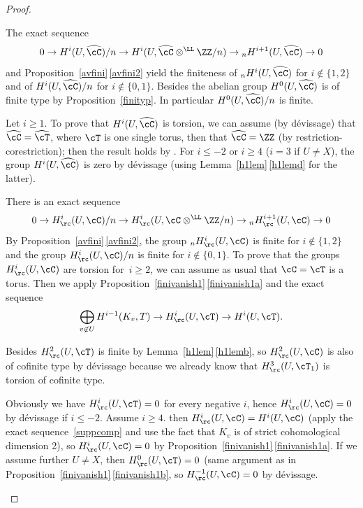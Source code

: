 \skpt
\begin{proof}
\begin{enumeratea}
\item
The exact sequence
\begin{equation} \label{kummer3}
0 \to H^i(U,\widehat \cC)/n \to H^i(U,\widehat \cC
\otimes^\LL \ZZ/n) \to{}_n H^{i+1}(U,\widehat \cC) \to 0
\end{equation}
and Proposition~\ref{avfini}\,\eqref{avfini2} yield the finiteness of
$_n H^i(U,\widehat \cC)$ for $i \not \in \{1, 2\}$
and of $H^i(U,\widehat \cC)/n$ for $i \not \in \{0, 1\}$.
Besides the abelian group $H^0(U,\widehat \cC)$ is of finite type
by Proposition~\ref{finityp}.
In particular $H^0(U,\widehat \cC)/n$ is finite.

Let $i \geq 1$. To prove that $H^i(U,\widehat \cC)$ is torsion,
we can assume (by dévissage) that $\widehat \cC=\widehat \cT$, where
$\cT$ is one single torus,
then that $\widehat \cC=\ZZ$ (by restriction-corestriction); then
the result holds by \cite[Lem.\,II.2.10]{MilADT}. For $i \leq -2$ or
$i \geq 4$ (\resp $i=3$ if $U \neq X$),
the group $H^i(U,\widehat \cC)$ is zero by
dévissage (using Lemma~\ref{h1lem}\,\eqref{h1lemd} for the latter).

\item
There is an exact sequence
\begin{equation} \label{kummer4}
0 \to H^i_\rc(U,\cC)/n \to H^i_\rc(U,\cC
\otimes^\LL \ZZ/n) \to{}_n H^{i+1}_\rc(U,\cC) \to 0
\end{equation}
By Proposition~\ref{avfini}\,\eqref{avfini2}, the group $_n H^i_\rc(U,\cC)$
is finite for $i \not \in \{1, 2\}$ and the group
$H^i_\rc(U,\cC)/n$ is finite for $i \not \in \{0, 1\}$.
To prove that the groups
$H^i_\rc(U,\cC)$ are torsion for~$i \geq 2$, we can assume
as usual that $\cC=\cT$ is a torus.
Then we apply
Proposition~\ref{finivanish1}\,\eqref{finivanish1a} and the exact sequence
\[
\bigoplus_{v \not \in U} H^{i-1}(K_v,T) \to
H^i_\rc(U,\cT) \to H^i(U,\cT).
\]

Besides $H^2_\rc(U,\cT)$ is finite by Lemma~\ref{h1lem}\,\eqref{h1lemb}, so
$H^2_\rc(U,\cC)$ is also of cofinite type by dévissage
because we already know that
$H^3_\rc(U,\cT_1)$ is torsion of cofinite type.

Obviously we have $H^i_\rc(U,\cT)=0$ for every negative $i$, hence
$H^i_\rc(U,\cC)=0$ by dévissage if $i \leq -2$. Assume $i \geq 4$.
then $H^i_\rc(U,\cC)=H^i(U,\cC)$ (apply the
exact sequence~\eqref{suppcomp} and use the fact that $K_v$ is of
strict cohomological dimension 2), so $H^i_\rc(U,\cC)=0$
by Proposition~\ref{finivanish1}\,\eqref{finivanish1a}. If we assume further $U \neq X$,
then $H^0_\rc(U,\cT)=0$ (same argument as in
Proposition~\ref{finivanish1}\,\eqref{finivanish1b}, so $H^{-1}_\rc(U,\cC)=0$ by dévissage.\qedhere
\end{enumeratea}
\end{proof}

